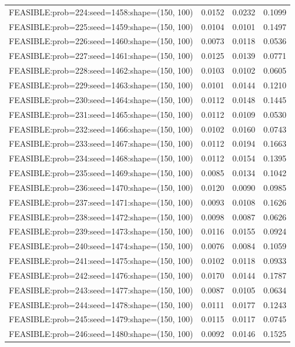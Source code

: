 \begin{longtable}{lccc}
FEASIBLE:prob=224:seed=1458:shape=(150, 100) & 0.0152 & 0.0232 & 0.1099 \\
FEASIBLE:prob=225:seed=1459:shape=(150, 100) & 0.0104 & 0.0101 & 0.1497 \\
FEASIBLE:prob=226:seed=1460:shape=(150, 100) & 0.0073 & 0.0118 & 0.0536 \\
FEASIBLE:prob=227:seed=1461:shape=(150, 100) & 0.0125 & 0.0139 & 0.0771 \\
FEASIBLE:prob=228:seed=1462:shape=(150, 100) & 0.0103 & 0.0102 & 0.0605 \\
FEASIBLE:prob=229:seed=1463:shape=(150, 100) & 0.0101 & 0.0144 & 0.1210 \\
FEASIBLE:prob=230:seed=1464:shape=(150, 100) & 0.0112 & 0.0148 & 0.1445 \\
FEASIBLE:prob=231:seed=1465:shape=(150, 100) & 0.0112 & 0.0109 & 0.0530 \\
FEASIBLE:prob=232:seed=1466:shape=(150, 100) & 0.0102 & 0.0160 & 0.0743 \\
FEASIBLE:prob=233:seed=1467:shape=(150, 100) & 0.0112 & 0.0194 & 0.1663 \\
FEASIBLE:prob=234:seed=1468:shape=(150, 100) & 0.0112 & 0.0154 & 0.1395 \\
FEASIBLE:prob=235:seed=1469:shape=(150, 100) & 0.0085 & 0.0134 & 0.1042 \\
FEASIBLE:prob=236:seed=1470:shape=(150, 100) & 0.0120 & 0.0090 & 0.0985 \\
FEASIBLE:prob=237:seed=1471:shape=(150, 100) & 0.0093 & 0.0108 & 0.1626 \\
FEASIBLE:prob=238:seed=1472:shape=(150, 100) & 0.0098 & 0.0087 & 0.0626 \\
FEASIBLE:prob=239:seed=1473:shape=(150, 100) & 0.0116 & 0.0155 & 0.0924 \\
FEASIBLE:prob=240:seed=1474:shape=(150, 100) & 0.0076 & 0.0084 & 0.1059 \\
FEASIBLE:prob=241:seed=1475:shape=(150, 100) & 0.0102 & 0.0118 & 0.0933 \\
FEASIBLE:prob=242:seed=1476:shape=(150, 100) & 0.0170 & 0.0144 & 0.1787 \\
FEASIBLE:prob=243:seed=1477:shape=(150, 100) & 0.0087 & 0.0105 & 0.0634 \\
FEASIBLE:prob=244:seed=1478:shape=(150, 100) & 0.0111 & 0.0177 & 0.1243 \\
FEASIBLE:prob=245:seed=1479:shape=(150, 100) & 0.0115 & 0.0117 & 0.0745 \\
FEASIBLE:prob=246:seed=1480:shape=(150, 100) & 0.0092 & 0.0146 & 0.1525 \\

\end{longtable}

